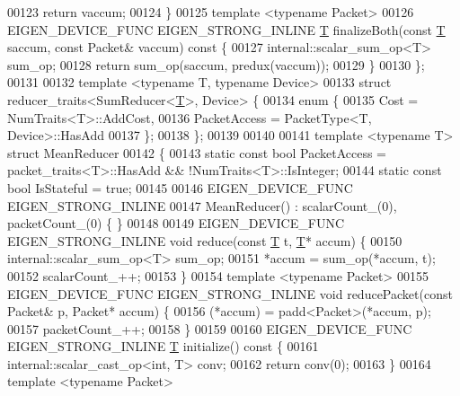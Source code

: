 \begin{DoxyCode}
00123     \textcolor{keywordflow}{return} vaccum;
00124   \}
00125   \textcolor{keyword}{template} <\textcolor{keyword}{typename} Packet>
00126   EIGEN\_DEVICE\_FUNC EIGEN\_STRONG\_INLINE \hyperlink{group___sparse_core___module_class_eigen_1_1_triplet}{T} finalizeBoth(\textcolor{keyword}{const} \hyperlink{group___sparse_core___module_class_eigen_1_1_triplet}{T} saccum, \textcolor{keyword}{const} Packet& vaccum)\textcolor{keyword}{ const }\{
00127     internal::scalar\_sum\_op<T> sum\_op;
00128     \textcolor{keywordflow}{return} sum\_op(saccum, predux(vaccum));
00129   \}
00130 \};
00131 
00132 \textcolor{keyword}{template} <\textcolor{keyword}{typename} T, \textcolor{keyword}{typename} Device>
00133 \textcolor{keyword}{struct }reducer\_traits<SumReducer<\hyperlink{group___sparse_core___module_class_eigen_1_1_triplet}{T}>, Device> \{
00134   \textcolor{keyword}{enum} \{
00135     Cost = NumTraits<T>::AddCost,
00136     PacketAccess = PacketType<T, Device>::HasAdd
00137   \};
00138 \};
00139 
00140 
00141 \textcolor{keyword}{template} <\textcolor{keyword}{typename} T> \textcolor{keyword}{struct }MeanReducer
00142 \{
00143   \textcolor{keyword}{static} \textcolor{keyword}{const} \textcolor{keywordtype}{bool} PacketAccess = packet\_traits<T>::HasAdd && !NumTraits<T>::IsInteger;
00144   \textcolor{keyword}{static} \textcolor{keyword}{const} \textcolor{keywordtype}{bool} IsStateful = \textcolor{keyword}{true};
00145 
00146   EIGEN\_DEVICE\_FUNC EIGEN\_STRONG\_INLINE
00147   MeanReducer() : scalarCount\_(0), packetCount\_(0) \{ \}
00148 
00149   EIGEN\_DEVICE\_FUNC EIGEN\_STRONG\_INLINE \textcolor{keywordtype}{void} reduce(\textcolor{keyword}{const} \hyperlink{group___sparse_core___module_class_eigen_1_1_triplet}{T} t, \hyperlink{group___sparse_core___module_class_eigen_1_1_triplet}{T}* accum) \{
00150     internal::scalar\_sum\_op<T> sum\_op;
00151     *accum = sum\_op(*accum, t);
00152     scalarCount\_++;
00153   \}
00154   \textcolor{keyword}{template} <\textcolor{keyword}{typename} Packet>
00155   EIGEN\_DEVICE\_FUNC EIGEN\_STRONG\_INLINE \textcolor{keywordtype}{void} reducePacket(\textcolor{keyword}{const} Packet& p, Packet* accum) \{
00156     (*accum) = padd<Packet>(*accum, p);
00157     packetCount\_++;
00158   \}
00159 
00160   EIGEN\_DEVICE\_FUNC EIGEN\_STRONG\_INLINE \hyperlink{group___sparse_core___module_class_eigen_1_1_triplet}{T} initialize()\textcolor{keyword}{ const }\{
00161     internal::scalar\_cast\_op<int, T> conv;
00162     \textcolor{keywordflow}{return} conv(0);
00163   \}
00164   \textcolor{keyword}{template} <\textcolor{keyword}{typename} Packet>

\end{DoxyCode}

